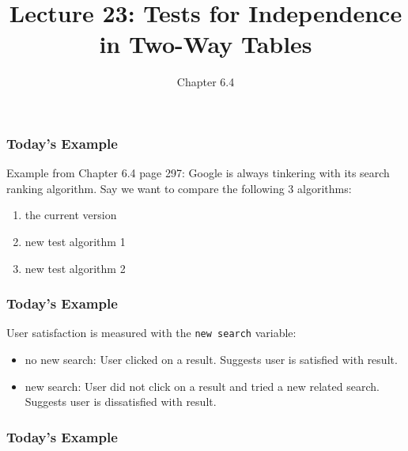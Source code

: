 \documentclass[handout]{beamer}
\title{Lecture 23: Tests for Independence in Two-Way Tables}
\author{Chapter 6.4}
\date{}
\newcommand{\blue}[1]{\textcolor{blue2}{#1}}
\begin{document}
\begin{frame}
\titlepage
\end{frame}



\begin{frame}
\frametitle{Today's Example}
Example from Chapter 6.4 page 297: Google is always tinkering with its search ranking algorithm.  Say we want to compare the following 3 algorithms:
\begin{enumerate}
\item the current version
\item new test algorithm 1
\item new test algorithm 2
\end{enumerate}

\end{frame}


\begin{frame}
\frametitle{Today's Example}

User satisfaction is measured with the \blue{{\tt new search}} variable:
\begin{itemize}
\pause\item no new search: User clicked on a result. Suggests user is satisfied with result.
\pause\item new search: User did not click on a result and tried a new related search.  Suggests user is \blue{dissatisfied} with result.
\end{itemize}


\end{frame}


\begin{frame}
\frametitle{Today's Example}
%
%
%
%

\end{frame}
\end{document}
